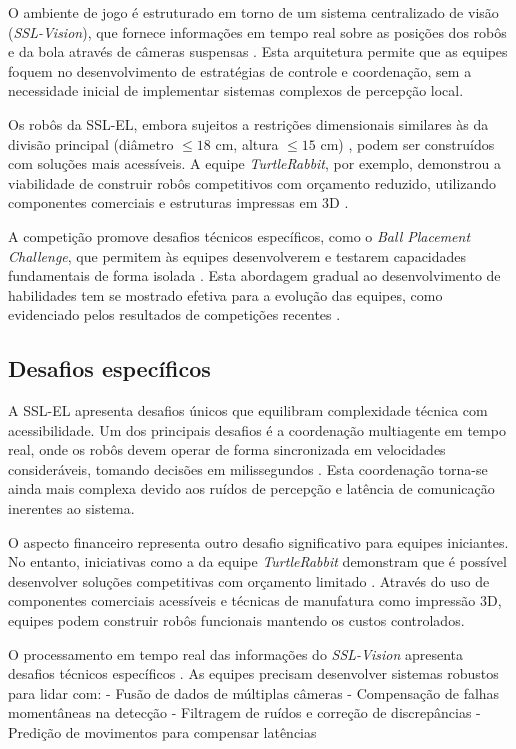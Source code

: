 O ambiente de jogo é estruturado em torno de um sistema centralizado de visão (\textit{SSL-Vision}), que fornece informações em tempo real sobre as posições dos robôs e da bola através de câmeras suspensas \cite{ssl_overview}. Esta arquitetura permite que as equipes foquem no desenvolvimento de estratégias de controle e coordenação, sem a necessidade inicial de implementar sistemas complexos de percepção local.

Os robôs da SSL-EL, embora sujeitos a restrições dimensionais similares às da divisão principal (diâmetro $\leq 18$ cm, altura $\leq 15$ cm) \cite{regras_ssl_el_2024}, podem ser construídos com soluções mais acessíveis. A equipe \textit{TurtleRabbit}, por exemplo, demonstrou a viabilidade de construir robôs competitivos com orçamento reduzido, utilizando componentes comerciais e estruturas impressas em 3D \cite{turtlerabbit_tdp_2024}.

A competição promove desafios técnicos específicos, como o \textit{Ball Placement Challenge}, que permitem às equipes desenvolverem e testarem capacidades fundamentais de forma isolada \cite{ssl_overview}. Esta abordagem gradual ao desenvolvimento de habilidades tem se mostrado efetiva para a evolução das equipes, como evidenciado pelos resultados de competições recentes \cite{ssl_overview}.

\subsection{Desafios específicos}
\label{subsec:futebol_desafios}

A SSL-EL apresenta desafios únicos que equilibram complexidade técnica com acessibilidade. Um dos principais desafios é a coordenação multiagente em tempo real, onde os robôs devem operar de forma sincronizada em velocidades consideráveis, tomando decisões em milissegundos \cite{regras_ssl_el_2024}. Esta coordenação torna-se ainda mais complexa devido aos ruídos de percepção e latência de comunicação inerentes ao sistema.

O aspecto financeiro representa outro desafio significativo para equipes iniciantes. No entanto, iniciativas como a da equipe \textit{TurtleRabbit} demonstram que é possível desenvolver soluções competitivas com orçamento limitado \cite{turtlerabbit_tdp_2024}. Através do uso de componentes comerciais acessíveis e técnicas de manufatura como impressão 3D, equipes podem construir robôs funcionais mantendo os custos controlados.

O processamento em tempo real das informações do \textit{SSL-Vision} apresenta desafios técnicos específicos \cite{ssl_overview}. As equipes precisam desenvolver sistemas robustos para lidar com:
- Fusão de dados de múltiplas câmeras
- Compensação de falhas momentâneas na detecção
- Filtragem de ruídos e correção de discrepâncias
- Predição de movimentos para compensar latências

